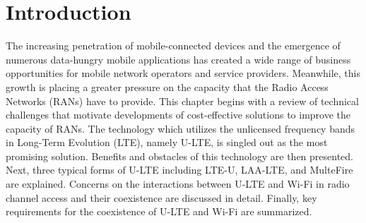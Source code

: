 %
%
%
\chapter{Introduction}
\label{intro} 


The increasing penetration of mobile-connected devices and the emergence of numerous data-hungry mobile applications has created a wide range of business opportunities for mobile network operators and service providers. Meanwhile, this growth is placing a greater pressure on the capacity that the Radio Access Networks (RANs) have to provide. This chapter begins with a review of technical challenges that motivate developments of cost-effective solutions to improve the capacity of RANs. The technology which utilizes the unlicensed frequency bands in Long-Term Evolution (LTE), namely \mbox{U-LTE}, is singled out as the most promising solution. Benefits and obstacles of this technology are then presented. Next, three typical forms of \mbox{U-LTE} including \mbox{LTE-U}, \mbox{LAA-LTE}, and MulteFire are explained. Concerns on the interactions between \mbox{U-LTE} and \mbox{Wi-Fi} in radio channel access and their coexistence are discussed in detail. Finally, key requirements for the coexistence of \mbox{U-LTE} and \mbox{Wi-Fi} are summarized.


